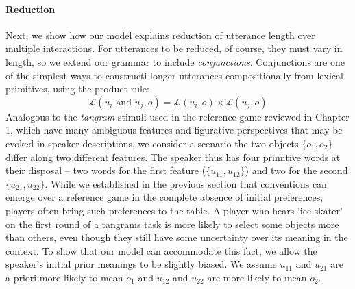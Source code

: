 \paragraph{Reduction}
Next, we show how our model explains reduction of utterance length over multiple interactions. 
For utterances to be reduced, of course, they must vary in length, so we extend our grammar to include \emph{conjunctions}. 
Conjunctions are one of the simplest ways to constructi longer utterances compositionally from lexical primitives, using the product rule:
$$\mathcal{L}(u_i \textrm{ and } u_j, o) = \mathcal{L}(u_i, o) \times \mathcal{L}(u_j, o)$$
\indent Analogous to the \emph{tangram} stimuli used in the reference game reviewed in Chapter 1, which have many ambiguous features and figurative perspectives that may be evoked in speaker descriptions, we consider a scenario the two objects $\{o_1, o_2\}$ differ along two different features. 
The speaker thus has four primitive words at their disposal -- two words for the first feature ($\{u_{11}, u_{12}\}$) and two for the second $\{u_{21}, u_{22}\}$. 
While we established in the previous section that conventions can emerge over a reference game in the complete absence of initial preferences, players often bring such preferences to the table. 
A player who hears `ice skater' on the first round of a tangrams task is more likely to select some objects more than others, even though they still have some uncertainty over its meaning in the context. 
To show that our model can accommodate this fact, we allow the speaker's initial prior meanings to be slightly biased. 
We assume $u_{11}$ and $u_{21}$ are a priori more likely to mean $o_1$ and $u_{12}$ and $u_{22}$ are more likely to mean $o_2$.

